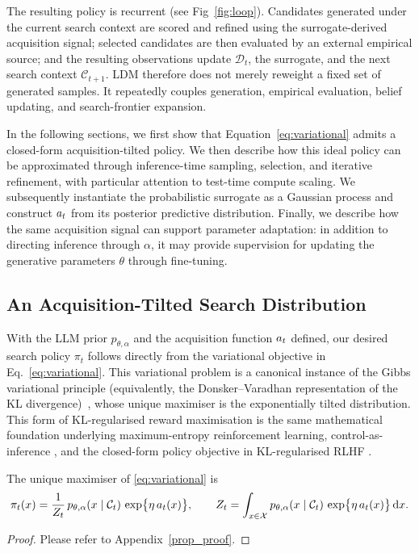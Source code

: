 The resulting policy is recurrent (see Fig~\ref{fig:loop}). Candidates generated under the current
search context are scored and refined using the surrogate-derived acquisition
signal; selected candidates are then evaluated by an external empirical
source; and the resulting observations update $\mathcal{D}_t$, the surrogate,
and the next search context $\mathcal{C}_{t+1}$. LDM therefore does not merely
reweight a fixed set of generated samples. It repeatedly couples generation,
empirical evaluation, belief updating, and search-frontier expansion.

In the following sections, we first show that
Equation~\eqref{eq:variational} admits a closed-form acquisition-tilted policy.
We then describe how this ideal policy can be approximated through
inference-time sampling, selection, and iterative refinement, with particular
attention to test-time compute scaling. We subsequently instantiate the
probabilistic surrogate as a Gaussian process and construct $a_t$ from its
posterior predictive distribution. Finally, we describe how the same
acquisition signal can support parameter adaptation: in addition to directing
inference through $\alpha$, it may provide supervision for updating the
generative parameters $\theta$ through fine-tuning.


\subsection{An Acquisition-Tilted Search Distribution}
\label{sec:core}

With the LLM prior $p_{\theta,\alpha}$ and the acquisition function $a_t$ defined, our desired search policy $\pi_t$ follows directly from the variational objective in Eq.~\eqref{eq:variational}. This variational problem is a canonical instance of the Gibbs variational principle (equivalently, the Donsker–Varadhan representation of the KL divergence)~\citep{donsker1975variational,bissiri2016general}, whose unique maximiser is the exponentially tilted distribution. This form of KL-regularised reward maximisation is the same mathematical foundation underlying maximum-entropy reinforcement learning, control-as-inference \citep{levine2018reinforcement}, and the closed-form policy objective in KL-regularised RLHF \citep{rafailov2023direct}.

\begin{proposition}
\label{prop:gibbs}
The unique maximiser of \eqref{eq:variational} is
\begin{equation}
\label{eq:core}
\pi_t(x)=\frac{1}{Z_t}\,p_{\theta,\alpha}(x\mid\mathcal{C}_t)\,\exp\!\big\{\eta\,a_t(x)\big\},
\qquad Z_t=\int_{x\in\mathcal{X}}p_{\theta,\alpha}(x\mid\mathcal{C}_t)\,\exp\!\big\{\eta\,a_t(x)\big\}\,\mathrm{d}x.
\end{equation}
\end{proposition}
\begin{proof}
Please refer to Appendix~\ref{prop_proof}.
\end{proof}

